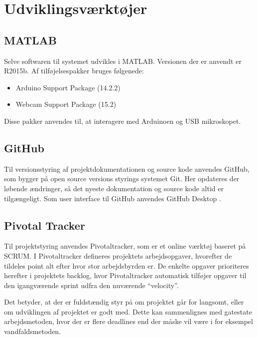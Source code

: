 \section{Udviklingsværktøjer}
\subsection{MATLAB}
Selve softwaren til systemet udvikles i MATLAB. Versionen der er anvendt er R2015b. Af tilføjelsespakker bruges følgenede:
\begin{itemize}
\item Arduino Support Package (14.2.2)
\item Webcam Support Package (15.2)
\end{itemize}
Disse pakker anvendes til, at interagere med Arduinoen og USB mikroskopet.
\subsection{GitHub}
Til versionsstyring af projektdokumentationen og source kode anvendes GitHub, som bygger på open source versions styrings systemet Git. Her opdateres der løbende ændringer, så det nyeste dokumentation og source kode altid er tilgængeligt. 
Som user interface til GitHub anvendes GitHub Desktop .
\subsection{Pivotal Tracker}
Til projektstyring anvendes Pivotaltracker, som er et online værktøj baseret på SCRUM. I Pivotaltracker defineres projektets arbejdsopgaver, hvorefter de tildeles point alt efter hvor stor arbejdsbyrden er. De enkelte opgaver prioriteres herefter i projektets backlog, hvor Pivotaltracker automatisk tilføjer opgaver til den igangværende sprint udfra den nuværende “velocity”.

Det betyder, at der er fuldstændig styr på om projektet går for langsomt, eller om udviklingen af projektet er godt med. Dette kan sammenlignes med gatestate arbejdsmetoden, hvor der er flere deadlines end der måske vil være i for eksempel vandfaldsmetoden. 